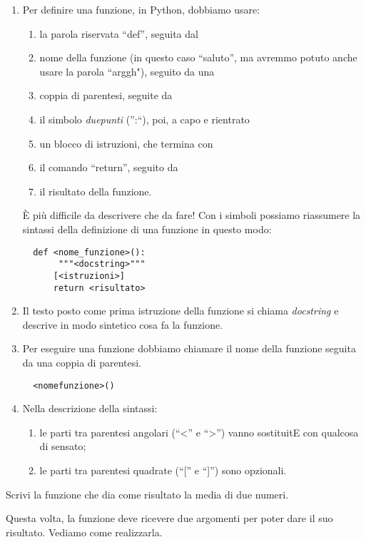 \begin{osservazione}
 \begin{enumerate} [nosep]
  \item Per definire una funzione, in Python,  dobbiamo usare:
  \begin{enumerate} [noitemsep]
   \item la parola riservata  ``def'', seguita dal
   \item nome della funzione (in questo caso  ``saluto'', ma avremmo potuto 
anche usare la parola  ``arggh"), seguito da una
   \item coppia di parentesi, seguite da
   \item il simbolo \emph{duepunti} ('':``), poi, a capo e rientrato
   \item un blocco di istruzioni, che termina con
   \item il comando  ``return'', seguito da
   \item il risultato della funzione.
  \end{enumerate}

  È più difficile da descrivere che da fare!
  Con i simboli possiamo riassumere la sintassi della definizione di una 
funzione in questo modo:
\begin{lstlisting}
  def <nome_funzione>():
       """<docstring>"""
      [<istruzioni>]
      return <risultato>
\end{lstlisting}

  \item Il testo posto come prima istruzione della funzione si chiama 
\emph{docstring} e descrive in modo sintetico cosa fa la funzione.
  \item Per eseguire una funzione dobbiamo chiamare il nome della funzione 
seguita da una coppia di parentesi.
\begin{lstlisting}
  <nomefunzione>()
\end{lstlisting}
  \item Nella descrizione della sintassi:
  \begin{enumerate} [nosep]
   \item le parti tra parentesi angolari (``<'' e  ``>'') vanno sostituitE 
con qualcosa di sensato;
   \item le parti tra parentesi quadrate (``['' e  ``]'') sono opzionali.
  \end{enumerate}
 \end{enumerate}
\end{osservazione}

\begin{esempio}
 Scrivi la funzione che dia come risultato la media di due numeri.

Questa volta, la funzione deve ricevere due argomenti per poter dare il suo 
risultato. Vediamo come realizzarla.


\end{esempio}

